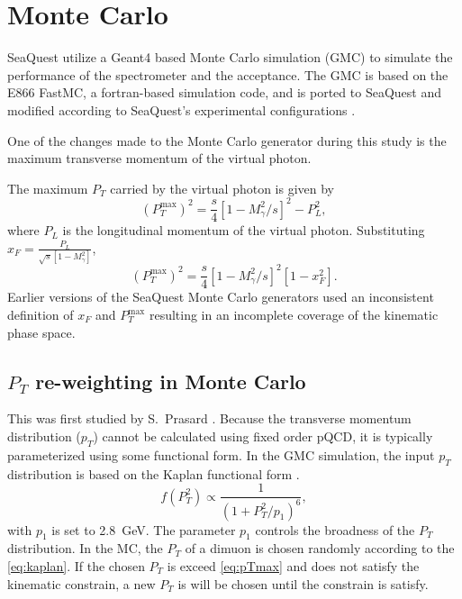 \documentclass[../main.tex]{subfiles}
\begin{document}
\section{Monte Carlo}
\label{sec:MC}
SeaQuest utilize a Geant4 based Monte Carlo simulation (GMC) to simulate the
performance of the spectrometer and the acceptance. The GMC is based on the 
E866 FastMC, a fortran-based simulation code, and is ported to SeaQuest and
modified according to SeaQuest’s experimental configurations \cite{kerns2018,prasad2020}.

One of the changes made to the Monte Carlo generator during this study 
is the maximum transverse momentum of the virtual photon.

The maximum $P_T$ carried by the virtual photon is given by
\begin{equation}
	\left(P_T^{\mathrm{max}}\right)^2 = \frac{s}{4} \left[1-M^2_\gamma/s\right]^2 - P_L^2,
\end{equation}
where $P_L$ is the longitudinal momentum of the virtual photon.
Substituting $x_F = \frac{P_L}{\sqrt{s}\left[1-M^2_\gamma\right]}$,
\begin{equation}
	\left(P_T^{\mathrm{max}}\right)^2 = \frac{s}{4} \left[1-M^2_\gamma/s\right]^2\left[1-x_F^2\right].
	\label{eq:pTmax}
\end{equation}
Earlier versions of the SeaQuest Monte Carlo generators used an inconsistent definition of $x_F$
and $P_T^{\mathrm{max}}$ resulting in an incomplete coverage of the kinematic phase space.

\subsection{\texorpdfstring{$P_T$}{P\_T} re-weighting in Monte Carlo}
This was first studied by S.~Prasard \cite{prasad2020}.
Because the transverse momentum distribution ($p_T$) cannot be calculated using
fixed order pQCD, it is typically parameterized using some functional form.
In the GMC simulation, the input $p_T$ distribution is based on the
Kaplan functional form \cite{kaplan1978}.
\begin{equation}
	f\left(P_T^2\right) \propto \frac{1}{\left(1+ P_T^2/p_1\right)^6},
	\label{eq:kaplan}
\end{equation}
with $p_1$ is set to \SI{2.8}{\GeV}. The parameter $p_1$ controls the broadness
of the $P_T$ distribution. In the MC, the $P_T$ of a dimuon is chosen randomly
according to the \cref{eq:kaplan}. If the chosen $P_T$ is exceed \cref{eq:pTmax}
and does not satisfy the kinematic constrain, a new $P_T$ is will be chosen until
the constrain is satisfy.
\end{document}
